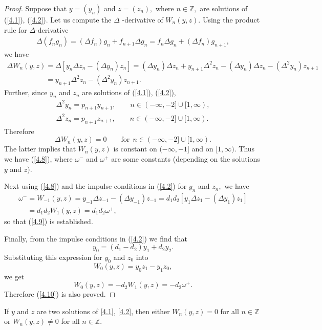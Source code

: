 \begin{proof}
Suppose that $y=(y_{n})$ and $z=(z_{n}),$ where $n\in
\mathbb{Z}
,$ are solutions of (\ref{4.1}), (\ref{4.2}). Let us compute the $\Delta $%
-derivative of $W_{n}(y,z)$. Using the product rule for $\Delta $-derivative%
\begin{gather*}
\Delta (f_{n}g_{n}) = (\Delta f_{n})g_{n}+f_{n+1}\Delta g_{n}
= f_{n}\Delta g_{n}+(\Delta f_{n})g_{n+1},
\end{gather*}
we have
\begin{gather*}
\Delta W_{n}(y,z)=\Delta \left[ y_{n}\Delta z_{n}-(\Delta y_{n})z_{n}\right]
=(\Delta y_{n})\Delta z_{n}+y_{n+1}\Delta ^{2}z_{n}-(\Delta y_{n})\Delta
z_{n}-(\Delta ^{2}y_{n})z_{n+1}
\\
\phantom{\Delta W_{n}(y,z)}{}
=y_{n+1}\Delta ^{2}z_{n}-(\Delta ^{2}y_{n})z_{n+1}.
\end{gather*}
Further, since $y_{n}$ and $z_{n}$ are solutions of (\ref{4.1}), (\ref{4.2}),%
\begin{gather*}
\Delta ^{2}y_{n}=p_{n+1}y_{n+1},\qquad n\in (-\infty ,-2]\cup \lbrack
1,\infty ),
\\
\Delta ^{2}z_{n}=p_{n+1}z_{n+1},\qquad n\in (-\infty ,-2]\cup \lbrack
1,\infty ).
\end{gather*}
Therefore%
\[
\Delta W_{n}(y,z)=0\qquad \text{for} \ \ n\in (-\infty ,-2]\cup \lbrack
1,\infty ).
\]%
The latter implies that $W_{n}(y,z)$ is constant on $(-\infty ,-1]$ and on $%
[1,\infty ).$ Thus we have (\ref{4.8}), where $\omega ^{-}$ and $\omega ^{+}$
are some constants (depending on the solutions $y$ and $z$).

Next using (\ref{4.8}) and the impulse conditions in (\ref{4.2}) for $y_{n}$
and $z_{n},$ we have{\samepage
\begin{gather*}
\omega ^{-}=W_{-1}(y,z)=y_{-1}\Delta z_{-1}-(\Delta y_{-1})z_{-1}
=d_{1}d_{2}[y_{1}\Delta z_{1}-(\Delta
y_{1})z_{1}]\\
\phantom{\omega ^{-}}{} =d_{1}d_{2}W_{1}(y,z)=d_{1}d_{2}\omega ^{+},
\end{gather*}
so that (\ref{4.9}) is established.}

Finally, from the impulse conditions in (\ref{4.2}) we f\/ind that%
\[
y_{0}=(d_{1}-d_{2})y_{1}+d_{2}y_{2}.
\]%
Substituting this expression for $y_{0}$ and $z_{0}$ into
\[
W_{0}(y,z)=y_{0}z_{1}-y_{1}z_{0},
\]%
we get%
\[
W_{0}(y,z)=-d_{2}W_{1}(y,z)=-d_{2}\omega ^{+}.
\]%
Therefore (\ref{4.10}) is also proved.
\end{proof}

\begin{corollary}
\label{Cor4.4}If $y$ and $z$ are two solutions of \eqref{4.1}, \eqref{4.2},
then either $W_{n}(y,z)=0$ for all $n\in
\mathbb{Z}$ or $W_{n}(y,z)\neq 0$ for all $n\in
\mathbb{Z}.$
\end{corollary}

